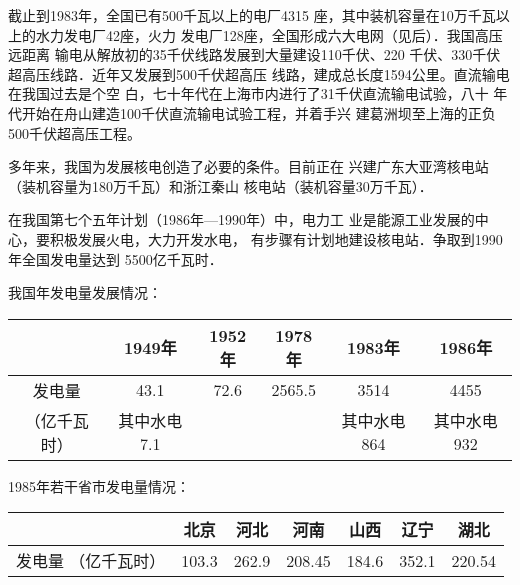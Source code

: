 截止到1983年，全国已有500千瓦以上的电厂4315
座，其中装机容量在10万千瓦以上的水力发电厂42座，火力
发电厂128座，全国形成六大电网（见后）．我国高压远距离
输电从解放初的35千伏线路发展到大量建设110千伏、220
千伏、330千伏超高压线路．近年又发展到500千伏超高压
线路，建成总长度1594公里。直流输电在我国过去是个空
白，七十年代在上海市内进行了31千伏直流输电试验，八十
年代开始在舟山建造100千伏直流输电试验工程，并着手兴
建葛洲坝至上海的正负500千伏超高压工程。

多年来，我国为发展核电创造了必要的条件。目前正在
兴建广东大亚湾核电站（装机容量为180万千瓦）和浙江秦山
核电站（装机容量30万千瓦）．

在我国第七个五年计划（1986年—1990年）中，电力工
业是能源工业发展的中心，要积极发展火电，大力开发水电，
有步骤有计划地建设核电站．争取到1990年全国发电量达到
5500亿千瓦时．

我国年发电量发展情况：
\begin{center}
\begin{tabular}{c|ccccc}
    \hline
   & 1949年&    1952年&    1978年&    1983年&    1986年\\
   \hline
   发电量  &43.1&   72.6 &  2565.5  & 3514   &    4455\\
   （亿千瓦时）&  其中水电7.1 &    &    &   其中水电864 &    其中水电932\\
   \hline
\end{tabular}
\end{center}

1985年若干省市发电量情况：
\begin{center}
\begin{tabular}{c|cccccc}
    \hline
   & 北京&   河北&   河南&   山西&   辽宁&   湖北\\
   \hline
   发电量 （亿千瓦时） &103.3&   262.9&   208.45&   184.6&   352.1&   220.54\\
   \hline
\end{tabular}
\end{center}

